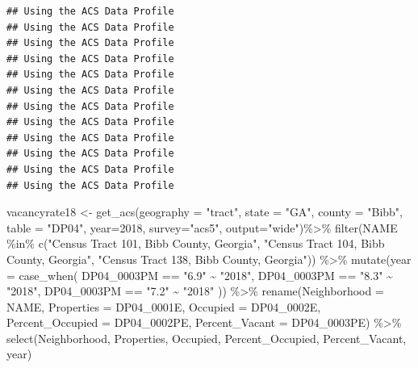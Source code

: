 \documentclass[
]{article}
\newenvironment{Shaded}{\begin{snugshade}}{\end{snugshade}}
\newcommand{\AttributeTok}[1]{\textcolor[rgb]{0.77,0.63,0.00}{#1}}
\newcommand{\DecValTok}[1]{\textcolor[rgb]{0.00,0.00,0.81}{#1}}
\newcommand{\FunctionTok}[1]{\textcolor[rgb]{0.00,0.00,0.00}{#1}}
\newcommand{\NormalTok}[1]{#1}
\newcommand{\OtherTok}[1]{\textcolor[rgb]{0.56,0.35,0.01}{#1}}
\newcommand{\SpecialCharTok}[1]{\textcolor[rgb]{0.00,0.00,0.00}{#1}}
\newcommand{\StringTok}[1]{\textcolor[rgb]{0.31,0.60,0.02}{#1}}
\begin{document}
\begin{verbatim}
## Using the ACS Data Profile
## Using the ACS Data Profile
## Using the ACS Data Profile
## Using the ACS Data Profile
## Using the ACS Data Profile
## Using the ACS Data Profile
## Using the ACS Data Profile
## Using the ACS Data Profile
## Using the ACS Data Profile
## Using the ACS Data Profile
## Using the ACS Data Profile
## Using the ACS Data Profile
\end{verbatim}

\begin{Shaded}
\begin{Highlighting}[]
\NormalTok{vacancyrate18 }\OtherTok{\textless{}{-}} \FunctionTok{get\_acs}\NormalTok{(}\AttributeTok{geography =} \StringTok{"tract"}\NormalTok{, }\AttributeTok{state =} \StringTok{"GA"}\NormalTok{, }\AttributeTok{county =} \StringTok{"Bibb"}\NormalTok{, }\AttributeTok{table =} \StringTok{"DP04"}\NormalTok{,  }\AttributeTok{year=}\DecValTok{2018}\NormalTok{, }\AttributeTok{survey=}\StringTok{"acs5"}\NormalTok{, }\AttributeTok{output=}\StringTok{"wide"}\NormalTok{)}\SpecialCharTok{\%\textgreater{}\%}
\FunctionTok{filter}\NormalTok{(NAME }\SpecialCharTok{\%in\%} \FunctionTok{c}\NormalTok{(}\StringTok{"Census Tract 101, Bibb County, Georgia"}\NormalTok{, }\StringTok{"Census Tract 104, Bibb County, Georgia"}\NormalTok{, }\StringTok{"Census Tract 138, Bibb County, Georgia"}\NormalTok{)) }\SpecialCharTok{\%\textgreater{}\%}
  \FunctionTok{mutate}\NormalTok{(}\AttributeTok{year =} \FunctionTok{case\_when}\NormalTok{(}
\NormalTok{    DP04\_0003PM }\SpecialCharTok{==} \StringTok{"6.9"} \SpecialCharTok{\textasciitilde{}} \StringTok{"2018"}\NormalTok{,}
\NormalTok{    DP04\_0003PM }\SpecialCharTok{==} \StringTok{"8.3"} \SpecialCharTok{\textasciitilde{}} \StringTok{"2018"}\NormalTok{,}
\NormalTok{    DP04\_0003PM }\SpecialCharTok{==} \StringTok{"7.2"} \SpecialCharTok{\textasciitilde{}} \StringTok{"2018"}
\NormalTok{  )) }\SpecialCharTok{\%\textgreater{}\%}
  \FunctionTok{rename}\NormalTok{(}\AttributeTok{Neighborhood =}\NormalTok{ NAME,}
         \AttributeTok{Properties =}\NormalTok{ DP04\_0001E,}
         \AttributeTok{Occupied =}\NormalTok{ DP04\_0002E,}
         \AttributeTok{Percent\_Occupied =}\NormalTok{ DP04\_0002PE,}
         \AttributeTok{Percent\_Vacant =}\NormalTok{ DP04\_0003PE) }\SpecialCharTok{\%\textgreater{}\%}
   \FunctionTok{select}\NormalTok{(Neighborhood, Properties, Occupied, Percent\_Occupied, Percent\_Vacant, year) }
\end{Highlighting}
\end{Shaded}
\end{document}
